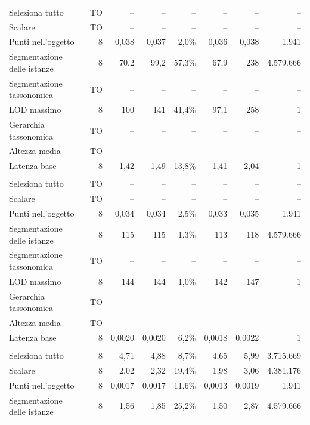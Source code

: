 \begin{small}
\begin{longtable}{lrrrrrr r}
\quad Seleziona tutto & \textsf{TO} & -- & -- & -- & -- & -- & -- \\
\quad Scalare & \textsf{TO} & -- & -- & -- & -- & -- & -- \\
\quad Punti nell'oggetto & 8 & 0,038 & 0,037 & 2,0\% & 0,036 & 0,038 & 1.941 \\
\quad Segmentazione delle istanze & 8 & 70,2 & 99,2 & 57,3\% & 67,9 & 238 & 4.579.666 \\
\quad Segmentazione tassonomica & \textsf{TO} & -- & -- & -- & -- & -- & -- \\
\quad LOD massimo & 8 & 100 & 141 & 41,4\% & 97,1 & 258 & 1 \\
\quad Gerarchia tassonomica & \textsf{TO} & -- & -- & -- & -- & -- & -- \\
\quad Altezza media & \textsf{TO} & -- & -- & -- & -- & -- & -- \\
\quad Latenza base & 8 & 1,42 & 1,49 & 13,8\% & 1,41 & 2,04 & 1 \\
\addlinespace
\multicolumn{8}{l}{\textbf{RDFLib+BDB}}\\
\quad Seleziona tutto & \textsf{TO} & -- & -- & -- & -- & -- & -- \\
\quad Scalare & \textsf{TO} & -- & -- & -- & -- & -- & -- \\
\quad Punti nell'oggetto & 8 & 0,034 & 0,034 & 2,5\% & 0,033 & 0,035 & 1.941 \\
\quad Segmentazione delle istanze & 8 & 115 & 115 & 1,3\% & 113 & 118 & 4.579.666 \\
\quad Segmentazione tassonomica & \textsf{TO} & -- & -- & -- & -- & -- & -- \\
\quad LOD massimo & 8 & 144 & 144 & 1,0\% & 142 & 147 & 1 \\
\quad Gerarchia tassonomica & \textsf{TO} & -- & -- & -- & -- & -- & -- \\
\quad Altezza media & \textsf{TO} & -- & -- & -- & -- & -- & -- \\
\quad Latenza base & 8 & 0,0020 & 0,0020 & 6,2\% & 0,0018 & 0,0022 & 1 \\
\addlinespace
\multicolumn{8}{l}{\textbf{RDFox}}\\
\quad Seleziona tutto & 8 & 4,71 & 4,88 & 8,7\% & 4,65 & 5,99 & 3.715.669 \\
\quad Scalare & 8 & 2,02 & 2,32 & 19,4\% & 1,98 & 3,06 & 4.381.176 \\
\quad Punti nell'oggetto & 8 & 0,0017 & 0,0017 & 11,6\% & 0,0013 & 0,0019 & 1.941 \\
\quad Segmentazione delle istanze & 8 & 1,56 & 1,85 & 25,2\% & 1,50 & 2,87 & 4.579.666 \\

\end{longtable}
\end{small}

